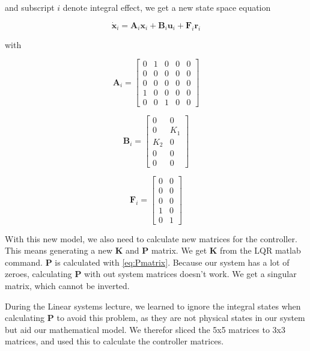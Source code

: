 and subscript $i$ denote integral effect, we get a new state space equation

\begin{equation} \label{eq:part3_prob3_5beer}
    \dot{\bm{x}}_i = \bm{A}_i \bm{x}_i + \bm{B}_i \bm{u}_i + \bm{F}_i \bm{r}_i
\end{equation}

with 

\begin{equation} \label{eq:A_pi}
    \bm{A}_i = 
	\begin{bmatrix}
		0 &  1 &  0 &  0 &  0 \\
		0 &  0 &  0 &  0 &  0 \\
		0 &  0 &  0 &  0 &  0 \\
		1 &  0 &  0 &  0 &  0 \\
		0 &  0 &  1 &  0 &  0
	\end{bmatrix}
\end{equation}

\begin{equation} \label{eq:B_pi}
    \bm{B}_i = 
	\begin{bmatrix}
		0   &  0 \\
		0   &  K_1 \\
		K_2 &  0 \\
		0   &  0 \\
		0   &  0
	\end{bmatrix}
\end{equation}


\begin{equation}
    \bm{F}_i = 
	\begin{bmatrix}
		0   &  0 \\
		0   &  0 \\
		0   &  0 \\
		1   &  0 \\
		0   &  1
	\end{bmatrix}
\end{equation} 

With this new model, we also need to calculate new matrices for the controller. This means generating a new $\bm{K}$ and $\bm{P}$ matrix. We get $\bm{K}$ from the LQR matlab command. $\bm{P}$ is calculated with \cref{eq:Pmatrix}. Because our system has a lot of zeroes, calculating $\bm{P}$ with out system matrices doesn't work. We get a singular matrix, which cannot be inverted.\medskip

During the Linear systems lecture, we learned to ignore the integral states when calculating $\bm{P}$ to avoid this problem, as they are not physical states in our system but aid our mathematical model. We therefor sliced the 5x5 matrices to 3x3 matrices, and used this to calculate the controller matrices.


